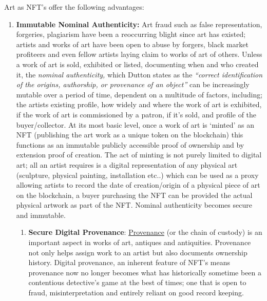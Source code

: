 Art as NFT's offer the following advantages:

\begin{enumerate}
\def\labelenumi{\arabic{enumi}.}
\item
  \textbf{Immutable Nominal Authenticity:} Art fraud such as false
  representation, forgeries, plagiarism have been a reoccurring blight
  since art has existed; artists and works of art have been open to
  abuse by forgers, black market profiteers and even fellow artists
  laying claim to works of art of others. Unless a work of art is sold,
  exhibited or listed, documenting when and who created it, the
  \emph{nominal authenticity,} which Dutton states as the
  \emph{``correct identification of the origins, authorship, or
  provenance of an object''} \cite{dutton2003authenticity} can be increasingly mutable over a period
  of time, dependent on a multitude of factors, including; the artists
  existing profile, how widely and where the work of art is exhibited,
  if the work of art is commissioned by a patron, if it's sold, and
  profile of the buyer/collector. At its most basic level, once a work
  of art is `minted' as an NFT (publishing the art work as a unique
  token on the blockchain) this functions as an immutable publicly
  accessible proof of ownership and by extension proof of creation. The
  act of minting is not purely limited to digital art; all an artist
  requires is a digital representation of any physical art (sculpture,
  physical painting, installation etc..) which can be used as a proxy
  allowing artists to record the date of creation/origin of a physical
  piece of art on the blockchain, a buyer purchasing the NFT can be
  provided the actual physical artwork as part of the NFT. Nominal
  authenticity becomes secure and immutable.

  \begin{enumerate}
  \def\labelenumii{\alph{enumii}.}
  \item
    \textbf{Secure Digital Provenance}:
    \href{https://en.wikipedia.org/wiki/Provenance}{Provenance} (or the
    chain of custody) is an important aspect in works of art, antiques
    and antiquities. Provenance not only helps assign work to an artist
    but also documents ownership history. Digital provenance, an
    inherent feature of NFT's means provenance now no longer becomes
    what has historically sometime been a contentious detective's game
    at the best of times; one that is open to fraud, misinterpretation
    and entirely reliant on good record keeping.
  \end{enumerate}
\end{enumerate}

